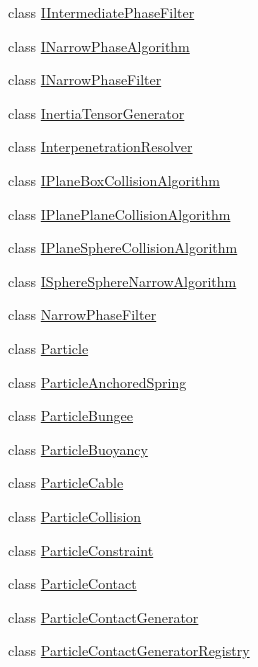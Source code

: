 \begin{DoxyCompactItemize}
\item 
class \mbox{\hyperlink{classr3_1_1_i_intermediate_phase_filter}{I\+Intermediate\+Phase\+Filter}}
\item 
class \mbox{\hyperlink{classr3_1_1_i_narrow_phase_algorithm}{I\+Narrow\+Phase\+Algorithm}}
\item 
class \mbox{\hyperlink{classr3_1_1_i_narrow_phase_filter}{I\+Narrow\+Phase\+Filter}}
\item 
class \mbox{\hyperlink{classr3_1_1_inertia_tensor_generator}{Inertia\+Tensor\+Generator}}
\item 
class \mbox{\hyperlink{classr3_1_1_interpenetration_resolver}{Interpenetration\+Resolver}}
\item 
class \mbox{\hyperlink{classr3_1_1_i_plane_box_collision_algorithm}{I\+Plane\+Box\+Collision\+Algorithm}}
\item 
class \mbox{\hyperlink{classr3_1_1_i_plane_plane_collision_algorithm}{I\+Plane\+Plane\+Collision\+Algorithm}}
\item 
class \mbox{\hyperlink{classr3_1_1_i_plane_sphere_collision_algorithm}{I\+Plane\+Sphere\+Collision\+Algorithm}}
\item 
class \mbox{\hyperlink{classr3_1_1_i_sphere_sphere_narrow_algorithm}{I\+Sphere\+Sphere\+Narrow\+Algorithm}}
\item 
class \mbox{\hyperlink{classr3_1_1_narrow_phase_filter}{Narrow\+Phase\+Filter}}
\item 
class \mbox{\hyperlink{classr3_1_1_particle}{Particle}}
\item 
class \mbox{\hyperlink{classr3_1_1_particle_anchored_spring}{Particle\+Anchored\+Spring}}
\item 
class \mbox{\hyperlink{classr3_1_1_particle_bungee}{Particle\+Bungee}}
\item 
class \mbox{\hyperlink{classr3_1_1_particle_buoyancy}{Particle\+Buoyancy}}
\item 
class \mbox{\hyperlink{classr3_1_1_particle_cable}{Particle\+Cable}}
\item 
class \mbox{\hyperlink{classr3_1_1_particle_collision}{Particle\+Collision}}
\item 
class \mbox{\hyperlink{classr3_1_1_particle_constraint}{Particle\+Constraint}}
\item 
class \mbox{\hyperlink{classr3_1_1_particle_contact}{Particle\+Contact}}
\item 
class \mbox{\hyperlink{classr3_1_1_particle_contact_generator}{Particle\+Contact\+Generator}}
\item 
class \mbox{\hyperlink{classr3_1_1_particle_contact_generator_registry}{Particle\+Contact\+Generator\+Registry}}

\end{DoxyCompactItemize}

